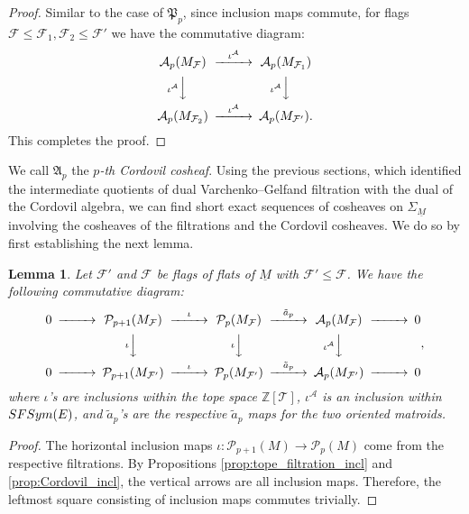 \documentclass{amsart}
\newtheorem{lemma}[theorem]{Lemma}
\newcommand\Acal{{\mathcal A}}
\newcommand\Fcal{{\mathcal F}}
\newcommand\Pcal{{\mathcal P}}
\newcommand\Tcal{{\mathcal T}}
\newcommand\ZZ{{\mathbb Z}}
\newcommand\Pfrak{{\mathfrak P}}
\begin{document}
{\begin{proof}
    Similar to the case of $\Pfrak_p$, since inclusion maps commute, for flags $\Fcal \leq \Fcal_1,\Fcal_2 \leq \Fcal'$ we have the commutative diagram:
   \begin{equation} \label{eq:CordSheaf}
    \begin{CD}
        \Acal_p(M_{\Fcal})     @>\iota^\Acal>>  \Acal_p(M_{\Fcal_1}) \\
        @V\iota^\Acal VV        @V\iota^\Acal VV\\
        \Acal_p(M_{\Fcal_2})    @>\iota^\Acal>> \Acal_p(M_{\Fcal'}).
    \end{CD}
    \end{equation}
    This completes the proof. 
\end{proof}

We call $\mathfrak{A}_p$ the {\em $p$-th Cordovil cosheaf}.
Using the previous sections, which identified the intermediate quotients of dual Varchenko--Gelfand filtration with the dual of the Cordovil algebra, we can find short exact sequences of cosheaves on $\Sigma_{\underline{M}}$ involving the cosheaves of the filtrations and the Cordovil cosheaves. We do so by first establishing the next lemma. 


\begin{lemma} \label{lem:CD_for_MF}
Let $\Fcal'$ and $\Fcal$ be flags of flats of $\underline{M}$ with $\Fcal' \leq \Fcal$.
We have the following commutative diagram: 
\begin{equation} \label{eq:SES}
\begin{CD}
0 @> >> \Pcal_{p+1}(M_{{\Fcal}})     @>\iota >> \Pcal_p(M_{{\Fcal}})     @>\tilde{a}_p>> \Acal_p({M_{\Fcal}}) @> >> 0 \\
@.  @V\iota VV  @V\iota VV        @V\iota^{\Acal} VV\\
 0 @> >>  \Pcal_{p+1}({M_{{\Fcal'}}})     @>\iota >> \Pcal_p(M_{{\Fcal'}})     @>\tilde{a}_p>>   \Acal_p(M_{{\Fcal'}})@> >> 0 
\end{CD},
\end{equation}
where $\iota$'s are inclusions within the tope space $\ZZ[\Tcal]$, $\iota^{\Acal}$ is an inclusion within ${\rm SFSym}(E)$, and $\tilde{a}_p$'s are the respective $\tilde{a}_p$ maps for the two oriented matroids.
\end{lemma}

\begin{proof}
The horizontal inclusion maps $\iota:\Pcal_{p+1}(M)\rightarrow \Pcal_p(M)$ come from the respective filtrations. By Propositions \ref{prop:tope_filtration_incl} and \ref{prop:Cordovil_incl}, the vertical arrows are all inclusion maps. 
Therefore, the leftmost square consisting of inclusion maps commutes trivially.


\end{proof}}
\end{document}
